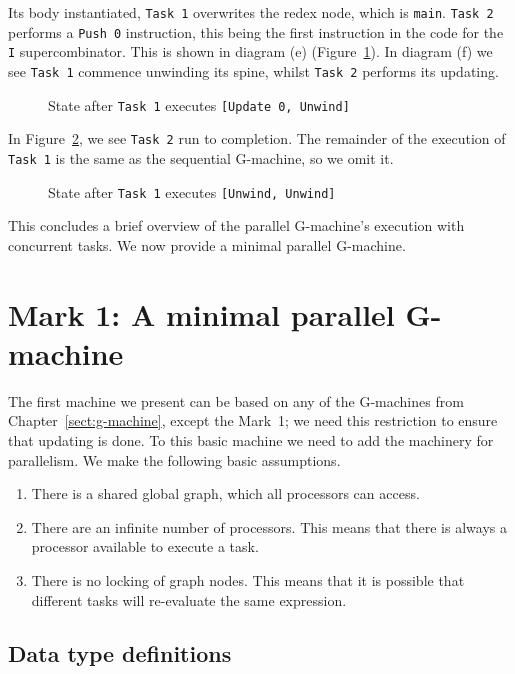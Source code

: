 Its body instantiated, \mbox{\tt Task\ 1} overwrites the redex node, which is
\mbox{\tt main}. \mbox{\tt Task\ 2} performs a \mbox{\tt Push\ 0} instruction, this being the first
instruction in the code for the \mbox{\tt I} supercombinator. This is shown in
diagram (e) (Figure~\ref{pgm:fg:1ex3}). In diagram (f) we see \mbox{\tt Task\ 1}
commence unwinding its spine, whilst \mbox{\tt Task\ 2} performs its updating.
\begin{figure}

\caption{State after \mbox{\tt Task\ 1} executes \mbox{\tt [Update\ 0,\ Unwind]}}
\label{pgm:fg:1ex3}
\end{figure}

In Figure~\ref{pgm:fg:1ex4}, we see \mbox{\tt Task\ 2} run to completion. The
remainder of the execution of \mbox{\tt Task\ 1} is the same as the sequential
G-machine, so we omit it.
\begin{figure}

\caption{State after \mbox{\tt Task\ 1} executes \mbox{\tt [Unwind,\ Unwind]}}
\label{pgm:fg:1ex4}
\end{figure}

This concludes a brief overview of the parallel G-machine's execution
with concurrent tasks. We now provide a minimal parallel G-machine.

\section{Mark 1: A minimal parallel G-machine}
\label{minimal-pgm}

The first machine we present can be based on any of the G-machines
from Chapter~\ref{sect:g-machine}, except the Mark~1; we need this
restriction to ensure that updating is done. To this basic machine we
need to add the machinery for parallelism. We make the following basic
assumptions.
\begin{enumerate}
\item There is a shared global graph, which all processors can access.
\item There are an infinite number of processors. This means that
there is always a processor available to execute a task.
\item There is no locking of graph nodes. This means that it is
possible that different tasks will re-evaluate the same expression.
\end{enumerate}

\subsection{Data type definitions}

